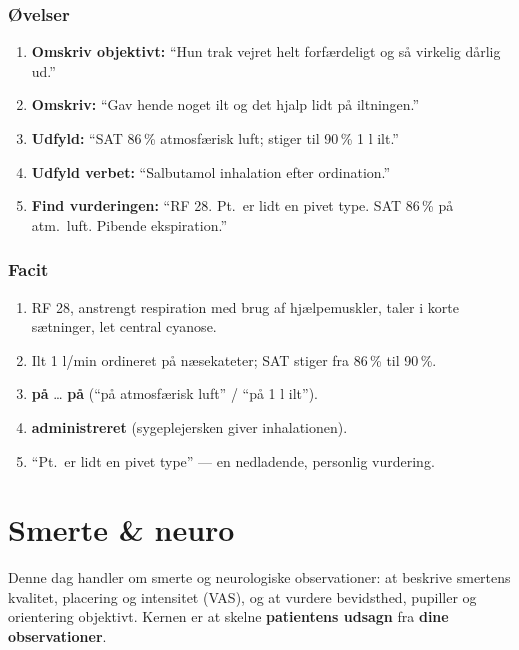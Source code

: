 \documentclass[11pt,a4paper]{report}
\begin{document}
\subsection{Øvelser}
\begin{enumerate}[leftmargin=1.5em,itemsep=8pt]
\item \textbf{Omskriv objektivt:} ``Hun trak vejret helt forfærdeligt og så virkelig dårlig ud.''
\item \textbf{Omskriv:} ``Gav hende noget ilt og det hjalp lidt på iltningen.''
\item \textbf{Udfyld:} ``SAT 86\,\% \underline{\hspace{1.5cm}} atmosfærisk luft; stiger til 90\,\% \underline{\hspace{1.5cm}} 1 l ilt.''
\item \textbf{Udfyld verbet:} ``Salbutamol inhalation \underline{\hspace{2.5cm}} efter ordination.''
\item \textbf{Find vurderingen:} ``RF 28. Pt.\ er lidt en pivet type. SAT 86\,\% på atm.\ luft. Pibende ekspiration.''
\end{enumerate}

\subsection{Facit}
\begin{enumerate}[leftmargin=1.5em,itemsep=5pt]
\item RF 28, anstrengt respiration med brug af hjælpemuskler, taler i korte sætninger, let central cyanose.
\item Ilt 1 l/min ordineret på næsekateter; SAT stiger fra 86\,\% til 90\,\%.
\item \textbf{på} \ldots{} \textbf{på} (``på atmosfærisk luft'' / ``på 1 l ilt'').
\item \textbf{administreret} (sygeplejersken giver inhalationen).
\item ``Pt.\ er lidt en pivet type'' --- en nedladende, personlig vurdering.
\end{enumerate}

\chapter{Smerte \& neuro}

Denne dag handler om smerte og neurologiske observationer: at beskrive smertens kvalitet,
placering og intensitet (VAS), og at vurdere bevidsthed, pupiller og orientering objektivt.
Kernen er at skelne \textbf{patientens udsagn} fra \textbf{dine observationer}.
\end{document}
